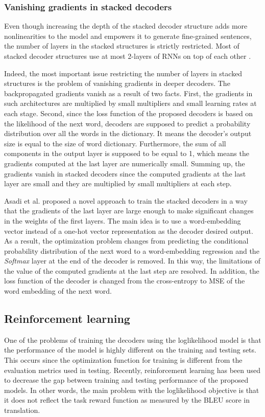 \documentclass[preprint, 12pt]{elsarticle}
\begin{document}
		\subsubsection{Vanishing gradients in stacked decoders}
		Even though increasing the depth of the stacked decoder structure adds more nonlinearities to the model and empowers it to generate fine-grained sentences, the number of layers in the stacked structures is strictly restricted. Most of stacked decoder structures use at most 2-layers of RNNs on top of each other \cite{donahue2015long} \cite{pan2016hierarchical} \cite{yu2016video}. 
		
		Indeed, the most important issue restricting the number of layers in stacked structures is the problem of vanishing gradients in deeper decoders. The backpropagated gradients vanish as a result of two facts. First, the gradients in such architectures are multiplied by small multipliers and small learning rates at each stage. Second, since the loss function of the proposed decoders is based on the likelihood of the next word, decoders are supposed to predict a probability distribution over all the words in the dictionary. It means the decoder's output size is equal to the size of word dictionary. Furthermore, the sum of all components in the output layer is supposed to be equal to 1, which means the gradients computed at the last layer are numerically small. Summing up, the gradients vanish in stacked decoders since the computed gradients at the last layer are small and they are multiplied by small multipliers at each step.
		
		Asadi et al. \cite{Asadi2019stacked} proposed a novel approach to train the stacked decoders in a way that the gradients of the last layer are large enough to make significant changes in the weights of the first layers. The main idea is to use a word-embedding vector instead of a one-hot vector representation as the decoder desired output. As a result, the optimization problem changes from predicting the conditional probability distribution of the next word to a word-embedding regression and the \textit{Softmax} layer at the end of the decoder is removed. In this way, the limitations of the value of the computed gradients at the last step are resolved. In addition, the loss function of the decoder is changed from the cross-entropy to MSE of the word embedding of the next word.
		
		\subsection{Reinforcement learning}
		One of the problems of training the decoders using the loglikelihood model is that the performance of the model is highly different on the training and testing sets. This occurs since the optimization function for training is different from the evaluation metrics used in testing. Recently, reinforcement learning has been used to decrease the gap between training and testing performance of the proposed models. In other words, the main problem with the loglikelihood objective is that it does not reflect the task reward function as measured by the BLEU score in translation. 
		
\end{document}
